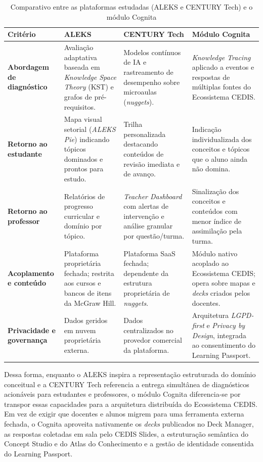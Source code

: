 \begin{table}[htb]
\caption{Comparativo entre as plataformas estudadas (ALEKS e CENTURY Tech) e o módulo Cognita}
\label{tab:comparativo-alternativas}
\centering
\begin{tabularx}{\textwidth}{>{\raggedright\arraybackslash}p{3.0cm}>{\raggedright\arraybackslash}X>{\raggedright\arraybackslash}X>{\raggedright\arraybackslash}X}
\hline
\textbf{Critério} & \textbf{ALEKS} & \textbf{CENTURY Tech} & \textbf{Módulo Cognita} \\
\hline
\textbf{Abordagem de diagnóstico} & Avaliação adaptativa baseada em \textit{Knowledge Space Theory} (KST) e grafos de pré-requisitos. & Modelos contínuos de IA e rastreamento de desempenho sobre microaulas (\textit{nuggets}). & \textit{Knowledge Tracing} aplicado a eventos e respostas de múltiplas fontes do Ecossistema CEDIS. \\
\hline
\textbf{Retorno ao estudante} & Mapa visual setorial (\textit{ALEKS Pie}) indicando tópicos dominados e prontos para estudo. & Trilha personalizada destacando conteúdos de revisão imediata e de avanço. & Indicação individualizada dos conceitos e tópicos que o aluno ainda não domina. \\
\hline
\textbf{Retorno ao professor} & Relatórios de progresso curricular e domínio por tópico. & \textit{Teacher Dashboard} com alertas de intervenção e análise granular por questão/turma. & Sinalização dos conceitos e conteúdos com menor índice de assimilação pela turma. \\
\hline
\textbf{Acoplamento e conteúdo} & Plataforma proprietária fechada; restrita aos cursos e bancos de itens da McGraw Hill. & Plataforma SaaS fechada; dependente da estrutura proprietária de \textit{nuggets}. & Módulo nativo acoplado ao Ecossistema CEDIS; opera sobre mapas e \textit{decks} criados pelos docentes. \\
\hline
\textbf{Privacidade e governança} & Dados geridos em nuvem proprietária externa. & Dados centralizados no provedor comercial da plataforma. & Arquitetura \textit{LGPD-first} e \textit{Privacy by Design}, integrada ao consentimento do Learning Passport. \\
\hline
\end{tabularx}
\end{table}

Dessa forma, enquanto o ALEKS inspira a representação estruturada do domínio conceitual e a CENTURY Tech referencia a entrega simultânea de diagnósticos acionáveis para estudantes e professores, o módulo Cognita diferencia-se por transpor essas capacidades para a arquitetura distribuída do Ecossistema CEDIS. Em vez de exigir que docentes e alunos migrem para uma ferramenta externa fechada, o Cognita aproveita nativamente os \textit{decks} publicados no Deck Manager, as respostas coletadas em sala pelo CEDIS Slides, a estruturação semântica do Concept Studio e do Atlas do Conhecimento e a gestão de identidade consentida do Learning Passport.

